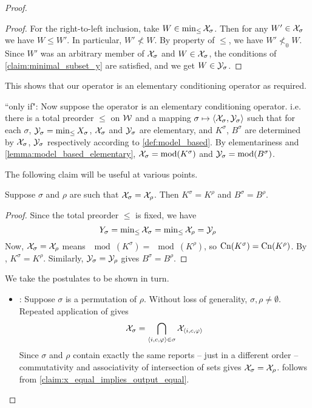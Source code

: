 \begin{proof}
\begin{proof}
        For the right-to-left inclusion, take $W \in \min_{\le}{\mathcal{X}_\sigma}$.
        Then for any $W' \in \mathcal{X}_\sigma$ we have $W \le W'$. In particular, $W'
        \not< W$. By property  of $\le$,
        we have $W' \not<_0 W$. Since $W'$ was an arbitrary member of
        $\mathcal{X}_\sigma$ and $W \in \mathcal{X}_\sigma$, the conditions of
        \cref{claim:minimal_subset_y} are satisfied, and we get $W \in
        \mathcal{Y}_\sigma$.
    \end{proof}

This shows that our operator is an elementary conditioning operator as
required.

``only if": Now  suppose the operator is an elementary conditioning operator.
i.e. there is a total preorder $\le$ on $\mathcal{W}$ and a mapping $\sigma \mapsto
\langle {\mathcal{X}_\sigma, \mathcal{Y}_\sigma} \rangle$ such that for each $\sigma$, $\mathcal{Y}_\sigma =
\min_{\le}{X_\sigma}$, $\mathcal{X}_\sigma$ and $\mathcal{Y}_\sigma$ are elementary, and
$K^\sigma$, $B^\sigma$ are determined by $\mathcal{X}_\sigma$, $\mathcal{Y}_\sigma$ respectively
according to \cref{def:model_based}. By elementariness and
\cref{lemma:model_based_elementary}, $\mathcal{X}_\sigma = \operatorname{mod}(K^\sigma)$ and $\mathcal{Y}_\sigma
= \operatorname{mod}(B^\sigma)$.

The following claim will be useful at various points.

    \begin{claim}
        \label{claim:x_equal_implies_output_equal}
        Suppose $\sigma$ and $\rho$ are such that $\mathcal{X}_\sigma = \mathcal{X}_\rho$. Then
        $K^\sigma = K^\rho$ and $B^\sigma = B^\rho$.
    \end{claim}
    \begin{proof}
        Since the total preorder $\le$ is fixed, we have
        \[
            Y_\sigma
            = \min\nolimits_{\le}{\mathcal{X}_\sigma}
            = \min\nolimits_{\le}{\mathcal{X}_\rho}
            = \mathcal{Y}_\rho
        \]
        Now, $\mathcal{X}_\sigma = \mathcal{X}_\rho$ means $\mod(K^\sigma) = \mod(K^\rho)$, so
        $\operatorname{Cn}(K^\sigma) = \operatorname{Cn}(K^\rho)$. By \closure{}, $K^\sigma = K^\rho$.
        Similarly, $\mathcal{Y}_\sigma = \mathcal{Y}_\rho$ gives $B^\sigma = B^\rho$.
    \end{proof}

We take the postulates to be shown in turn.

\begin{itemize}
    \item \rearr{}: Suppose $\sigma$ is a permutation of $\rho$.
          Without loss of generality, $\sigma, \rho \ne \emptyset$. Repeated
          application of \kconj{} gives
          \[
            \mathcal{X}_{\sigma} = \bigcap_{\langle {i, c, \varphi} \rangle \in \sigma}{\mathcal{X}_{\langle {i,
            c, \varphi} \rangle}}
          \]
          Since $\sigma$ and $\rho$ contain exactly the same reports -- just in
          a different order -- commutativity and associativity of intersection
          of sets gives $\mathcal{X}_\sigma = \mathcal{X}_\rho$. \rearr{} follows
          from \cref{claim:x_equal_implies_output_equal}.


\end{itemize}
\end{proof}
